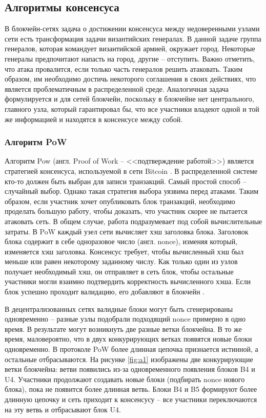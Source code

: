 \subsection{Алгоритмы консенсуса}

В блокчейн-сетях задача о достижении консенсуса между недоверенными узлами сети есть трансформация задачи византийских генералах. В данной задаче группа генералов, которая командует византийской армией, окружает город. Некоторые генералы предпочитают напасть на город, другие -- отступить. Важно отметить, что атака провалится, если только часть генералов решить атаковать. Таким образом, им необходимо достичь некоторого соглашения в своих действиях, что является проблематичным в распределенной среде. Аналогичная задача формулируется и для сетей блокчейн, поскольку в блокчейне нет центрального, главного узла, который гарантировал бы, что все участники владеют одной и той же информацией и находятся в консенсусе между собой.


\subsubsection{Алгоритм PoW}

Алгоритм Pow (англ. Proof of Work -- <<подтверждение работой>>) является стратегией консенсуса, используемой в сети Bitcoin \cite{bitcoin}. В распределенной системе кто-то должен быть выбран для записи транзакций. Самый простой способ -- случайный выбор. Однако такая стратегия выбора уязвима перед атаками. Таким образом, если участник хочет опубликовать блок транзакций, необходимо проделать большую работу, чтобы доказать, что участник скорее не пытается атаковать сеть. В общем случае, работа подразумевает под собой вычислительные затраты. В PoW каждый узел сети вычисляет хэш заголовка блока. Заголовок блока содержит в себе одноразовое число (англ. nonce), изменяя который, изменяется хэш заголовка. Консенсус требует, чтобы вычисленный хэш был меньше или равен некоторому заданному числу. Как только один из узлов получает необходимый хэш, он отправляет в сеть блок, чтобы остальные участники могли взаимно подтвердить корректность вычисленного хэша. Если блок успешно проходит валидацию, его добавляют в блокчейн \cite{ru-bchain2}.

В децентрализованных сетях валидные блоки могут быть сгенерированы одновременно -- разные узлы подобрали подходящий nonce примерно в одно время. В результате могут возникнуть две разные ветки блокчейна. В то же время, маловероятно, что в двух конкурирующих ветках появятся новые блоки одновременно. В протоколе PoW более длинная цепочка признается истинной, а остальные отбрасываются. На рисунке \ref{fig:a1} изображены две конкурирующие ветки блокчейна: ветви появились из-за одновременного появления блоков B4 и U4. Участники продолжают создавать новые блоки (подбирать nonce нового блока), пока не появится более длинная ветвь. Блоки B4 и B5 формируют более длинную цепочку и сеть приходит к консенсусу -- все участники переключаются на эту ветвь и отбрасывают блок U4. 

